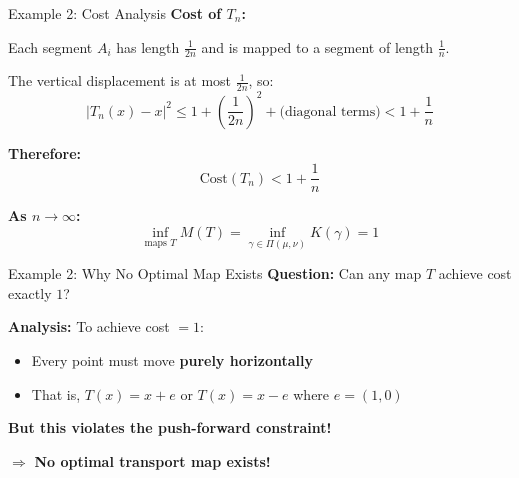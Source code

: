 \documentclass[aspectratio=169]{beamer}
\newcommand{\Hone}{\mathcal{H}^1}
\begin{document}
\begin{frame}{Example 2: Cost Analysis}
\textbf{Cost of $T_n$:}

Each segment $A_i$ has length $\frac{1}{2n}$ and is mapped to a segment of length $\frac{1}{n}$.

\vspace{0.3cm}
The vertical displacement is at most $\frac{1}{2n}$, so:
\[
|T_n(x) - x|^2 \leq 1 + \left(\frac{1}{2n}\right)^2 + \text{(diagonal terms)} < 1 + \frac{1}{n}
\]

\vspace{0.3cm}
\textbf{Therefore:}
\[
\boxed{\text{Cost}(T_n) < 1 + \frac{1}{n}}
\]

\vspace{0.3cm}
\textbf{As $n \to \infty$:}
\[
\inf_{\text{maps } T} M(T) = \inf_{\gamma \in \Pi(\mu,\nu)} K(\gamma) = 1
\]
\end{frame}

\begin{frame}{Example 2: Why No Optimal Map Exists}
\textbf{Question:} Can any map $T$ achieve cost exactly $1$?

\vspace{0.3cm}
\textbf{Analysis:} To achieve cost $= 1$:
\begin{itemize}
    \item Every point must move \textbf{purely horizontally}
    \item That is, $T(x) = x + e$ or $T(x) = x - e$ where $e = (1, 0)$
\end{itemize}

\vspace{0.3cm}
\textbf{But this violates the push-forward constraint!}

\begin{center}
\end{center}

$\Rightarrow$ \textbf{No optimal transport map exists!}
\end{frame}
\end{document}
